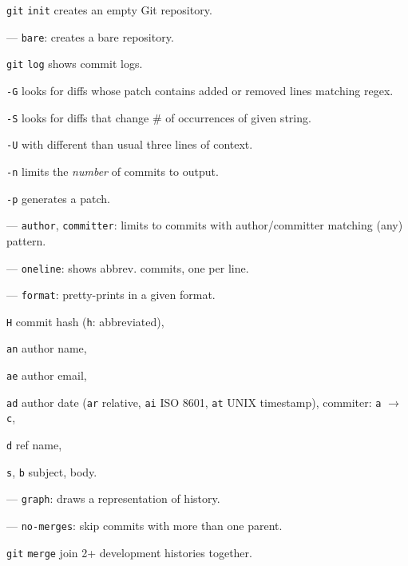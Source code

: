 \documentclass{reference_card}
\begin{document}
\begin{multicols*}{3}
\begin{compactenum}
\item [\texttt{git}] \texttt{init} creates an empty Git repository.
\item [---] \texttt{bare}: creates a bare repository.
\end{compactenum}

\begin{compactenum}
\item [\texttt{git}] \texttt{log} shows commit logs.
\item [\texttt{-G}] looks for diffs whose patch contains added or removed lines matching regex.
\item [\texttt{-S}] looks for diffs that change \# of occurrences of given string.
\item [\texttt{-U}] with different than usual three lines of context.
\item [\texttt{-n}] limits the \emph{number} of commits to output.
\item [\texttt{-p}] generates a patch.
\item [---] \texttt{author}, \texttt{committer}: limits to commits with author/committer matching (any) pattern.
\item [---] \texttt{oneline}: shows abbrev. commits, one per line.
\item [---] \texttt{format}: pretty-prints in a given format.
\begin{compactenum}
\item [\texttt{H}] commit hash (\texttt{h}: abbreviated),
\item [\texttt{an}] author name,
\item [\texttt{ae}] author email,
\item [\texttt{ad}] author date (\texttt{ar} relative, \texttt{ai} ISO 8601, \texttt{at} UNIX timestamp), commiter: \texttt{a} $\to$ \texttt{c},
\item [\texttt{d}] ref name,
\item [\texttt{s}, \texttt{b}] subject, body.
\end{compactenum}
\item [---] \texttt{graph}: draws a representation of history.
\item [---] \texttt{no-merges}: skip commits with more than one parent.
\end{compactenum}

\begin{compactenum}
\item [\texttt{git}] \texttt{merge} join 2+ development histories together.
\end{compactenum}


\end{multicols*}
\end{document}
